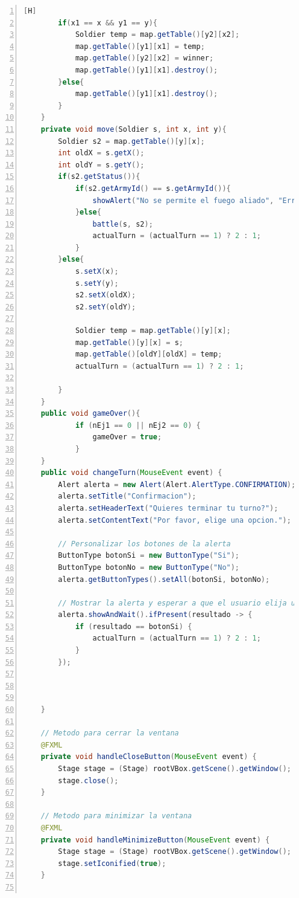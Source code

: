 \documentclass{article}
\begin{document}
\begin{lstlisting}[language=java,caption={Clase controladora}, numbers=left][H]
        if(x1 == x && y1 == y){
            Soldier temp = map.getTable()[y2][x2];
            map.getTable()[y1][x1] = temp;
            map.getTable()[y2][x2] = winner;
            map.getTable()[y1][x1].destroy();
        }else{
            map.getTable()[y1][x1].destroy();
        }
    }
    private void move(Soldier s, int x, int y){
        Soldier s2 = map.getTable()[y][x];
        int oldX = s.getX();
        int oldY = s.getY();
        if(s2.getStatus()){
            if(s2.getArmyId() == s.getArmyId()){
                showAlert("No se permite el fuego aliado", "Error");
            }else{
                battle(s, s2);
                actualTurn = (actualTurn == 1) ? 2 : 1;
            }
        }else{
            s.setX(x);
            s.setY(y);
            s2.setX(oldX);
            s2.setY(oldY);

            Soldier temp = map.getTable()[y][x];
            map.getTable()[y][x] = s;
            map.getTable()[oldY][oldX] = temp;
            actualTurn = (actualTurn == 1) ? 2 : 1;

        }
    }
    public void gameOver(){
            if (nEj1 == 0 || nEj2 == 0) {
                gameOver = true;
            }
    }
    public void changeTurn(MouseEvent event) {
        Alert alerta = new Alert(Alert.AlertType.CONFIRMATION);
        alerta.setTitle("Confirmacion");
        alerta.setHeaderText("Quieres terminar tu turno?");
        alerta.setContentText("Por favor, elige una opcion.");

        // Personalizar los botones de la alerta
        ButtonType botonSi = new ButtonType("Si");
        ButtonType botonNo = new ButtonType("No");
        alerta.getButtonTypes().setAll(botonSi, botonNo);

        // Mostrar la alerta y esperar a que el usuario elija una opcion
        alerta.showAndWait().ifPresent(resultado -> {
            if (resultado == botonSi) {
                actualTurn = (actualTurn == 1) ? 2 : 1;
            }
        });



    }

    // Metodo para cerrar la ventana
    @FXML
    private void handleCloseButton(MouseEvent event) {
        Stage stage = (Stage) rootVBox.getScene().getWindow();
        stage.close();
    }

    // Metodo para minimizar la ventana
    @FXML
    private void handleMinimizeButton(MouseEvent event) {
        Stage stage = (Stage) rootVBox.getScene().getWindow();
        stage.setIconified(true);
    }


\end{lstlisting}
\end{document}
